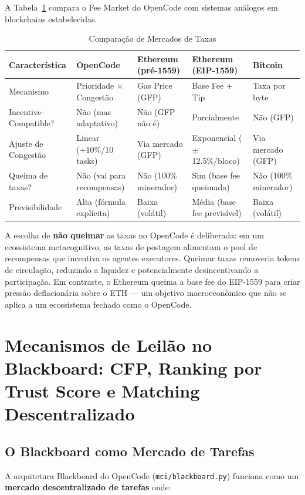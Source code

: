 A Tabela~\ref{tab:fee_comparison} compara o Fee Market do OpenCode com sistemas análogos em blockchains estabelecidas.

\begin{table}[htbp]
\centering
\caption{Comparação de Mercados de Taxas}
\label{tab:fee_comparison}
\begin{tabular}{p{2.5cm}p{3cm}p{3cm}p{3cm}p{3cm}}
\hline
\textbf{Característica} & \textbf{OpenCode} & \textbf{Ethereum (pré-1559)} & \textbf{Ethereum (EIP-1559)} & \textbf{Bitcoin} \\
\hline
Mecanismo & Prioridade $\times$ Congestão & Gas Price (GFP) & Base Fee + Tip & Taxa por byte \\
\hline
Incentive-Compatible? & Não (mas adaptativo) & Não (GFP não é) & Parcialmente & Não (GFP) \\
\hline
Ajuste de Congestão & Linear (+10\%/10 tasks) & Via mercado (GFP) & Exponencial ($\pm$12.5\%/bloco) & Via mercado (GFP) \\
\hline
Queima de taxas? & Não (vai para recompensas) & Não (100\% minerador) & Sim (base fee queimada) & Não (100\% minerador) \\
\hline
Previsibilidade & Alta (fórmula explícita) & Baixa (volátil) & Média (base fee previsível) & Baixa (volátil) \\
\hline
\end{tabular}
\end{table}

A escolha de \textbf{não queimar} as taxas no OpenCode é deliberada: em um ecossistema metacognitivo, as taxas de postagem alimentam o pool de recompensas que incentiva os agentes executores. Queimar taxas removeria tokens de circulação, reduzindo a liquidez e potencialmente desincentivando a participação. Em contraste, o Ethereum queima a base fee do EIP-1559 para criar pressão deflacionária sobre o ETH --- um objetivo macroeconômico que não se aplica a um ecossistema fechado como o OpenCode.

\section{Mecanismos de Leilão no Blackboard: CFP, Ranking por Trust Score e Matching Descentralizado}

\subsection{O Blackboard como Mercado de Tarefas}

A arquitetura Blackboard do OpenCode (\texttt{mci/blackboard.py}) funciona como um \textbf{mercado descentralizado de tarefas} onde:

